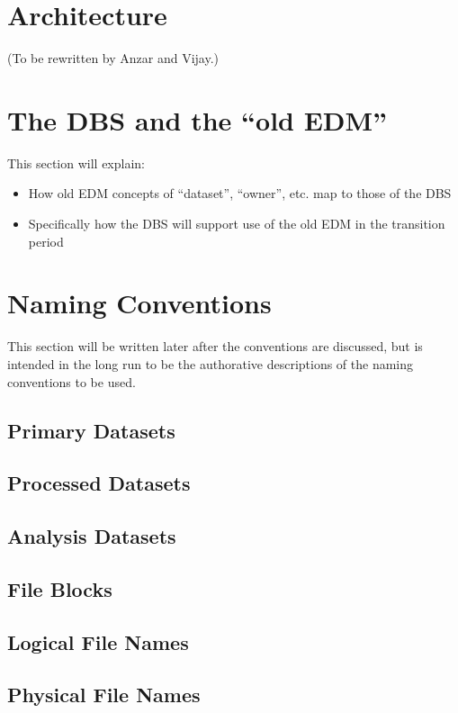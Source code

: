 \documentclass{cmspaper}
\begin{document}
{\section{Architecture}

(To be rewritten by Anzar and Vijay.)

\section{The DBS and the ``old EDM''}

  This section will explain:

\begin{itemize}
\item How old EDM concepts of ``dataset'', ``owner'', etc. map to those
      of the DBS
\item Specifically how the DBS will support use of the old EDM in the 
      transition period 
\end{itemize}

\section{Naming Conventions}

  This section will be written later after the conventions are discussed, but 
is intended in the long run to be the authorative descriptions of the naming
conventions to be used.
\subsection{Primary Datasets}
\subsection{Processed Datasets}
\subsection{Analysis Datasets}
\subsection{File Blocks}
\subsection{Logical File Names}
\subsection{Physical File Names}

}
\end{document}
